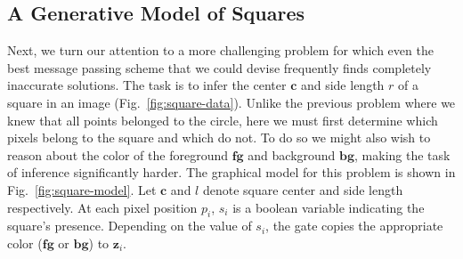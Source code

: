 \begin{figure}[t]
	\centering
	\label{fig:square-results}
\end{figure}


\subsection{A Generative Model of Squares}
\label{sec:square}

Next, we turn our attention to a more challenging problem for which even the best message passing scheme that we could devise frequently finds completely inaccurate solutions. The task is to infer the center $\mathbf{c}$ and side length $r$ of a square in an image (Fig.~\ref{fig:square-data}). Unlike the previous problem where we knew that all points belonged to the circle, here we must first determine which pixels belong to the square and which do not. To do so we might also wish to reason about the color of the foreground $\mathrm{\mathbf{fg}}$ and background $\mathrm{\mathbf{bg}}$, making the task of inference significantly harder. The graphical model for this problem is shown in Fig.~\ref{fig:square-model}. Let $\mathbf{c}$ and $l$ denote square center and side length respectively. At each pixel position $p_i$, $s_i$ is a boolean variable indicating the square's presence. Depending on the value of $s_i$, the gate copies the appropriate color ($\mathrm{\mathbf{fg}}$ or $\mathrm{\mathbf{bg}}$) to $\mathbf{z}_i$.

